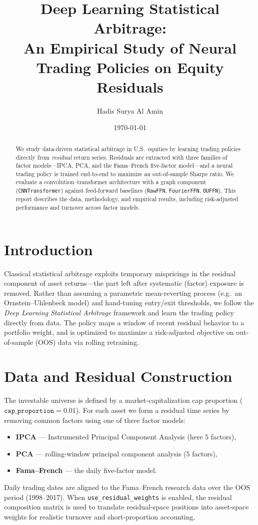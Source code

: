 \documentclass[11pt]{article}
\title{Deep Learning Statistical Arbitrage:\\ An Empirical Study of Neural Trading Policies on Equity Residuals}
\author[1]{Hadis Surya Al Amin}
\affil[1]{\small Project report -- based on the framework of Guijarro-Ordonez, Pelger, and Zanotti (2021)}
\date{\today}
\begin{document}
\maketitle

\begin{abstract}
We study data-driven statistical arbitrage in U.S.\ equities by learning trading
policies directly from \emph{residual} return series. Residuals are extracted with
three families of factor models---IPCA, PCA, and the Fama--French five-factor
model---and a neural trading policy is trained end-to-end to maximize an
out-of-sample Sharpe ratio. We evaluate a convolution--transformer architecture
with a graph component (\texttt{CNNTransformer}) against feed-forward baselines
(\texttt{RawFFN}, \texttt{FourierFFN}, \texttt{OUFFN}). This report describes the
data, methodology, and empirical results, including risk-adjusted performance and
turnover across factor models.
\end{abstract}

\section{Introduction}
Classical statistical arbitrage exploits temporary mispricings in the residual
component of asset returns---the part left after systematic (factor) exposure is
removed. Rather than assuming a parametric mean-reverting process (e.g.\ an
Ornstein--Uhlenbeck model) and hand-tuning entry/exit thresholds, we follow the
\emph{Deep Learning Statistical Arbitrage} framework and learn the trading policy
directly from data. The policy maps a window of recent residual behavior to a
portfolio weight, and is optimized to maximize a risk-adjusted objective on
out-of-sample (OOS) data via rolling retraining.

\section{Data and Residual Construction}
The investable universe is defined by a market-capitalization cap proportion
($\texttt{cap\_proportion} = 0.01$). For each asset we form a residual time series
by removing common factors using one of three factor models:
\begin{itemize}
  \item \textbf{IPCA} --- Instrumented Principal Component Analysis (here $5$ factors),
  \item \textbf{PCA} --- rolling-window principal component analysis ($5$ factors),
  \item \textbf{Fama--French} --- the daily five-factor model.
\end{itemize}
Daily trading dates are aligned to the Fama--French research data over the OOS
period (1998--2017). When \texttt{use\_residual\_weights} is enabled, the residual
composition matrix is used to translate residual-space positions into asset-space
weights for realistic turnover and short-proportion accounting.
\end{document}
